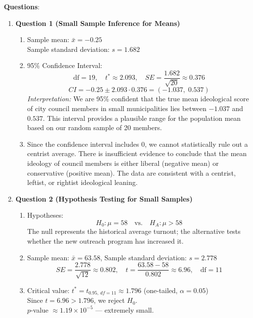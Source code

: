 \documentclass{article}
\begin{document}
\textbf{Questions}:
\begin{enumerate}

  \item \textbf{Question 1 (Small Sample Inference for Means)}
  \begin{enumerate}[label=(\alph*)]
    \item Sample mean: $\bar{x} = -0.25$ \\
          Sample standard deviation: $s = 1.682$

    \item 95\% Confidence Interval:
    \[
    \text{df} = 19,\quad t^* \approx 2.093,\quad SE = \frac{1.682}{\sqrt{20}} \approx 0.376
    \]
    \[
    CI = -0.25 \pm 2.093 \cdot 0.376 = (-1.037,\; 0.537)
    \]
    \textit{Interpretation:} We are 95\% confident that the true mean ideological score of city council members in small municipalities lies between $-1.037$ and $0.537$. This interval provides a plausible range for the population mean based on our random sample of 20 members.

    \item Since the confidence interval includes $0$, we cannot statistically rule out a centrist average. There is insufficient evidence to conclude that the mean ideology of council members is either liberal (negative mean) or conservative (positive mean). The data are consistent with a centrist, leftist, or rightist ideological leaning.
  \end{enumerate}

  \item \textbf{Question 2 (Hypothesis Testing for Small Samples)}
  \begin{enumerate}[label=(\alph*)]
    \item Hypotheses:
    \[
    H_0: \mu = 58 \quad\text{vs.}\quad H_A: \mu > 58
    \]
    The null represents the historical average turnout; the alternative tests whether the new outreach program has increased it.

    \item Sample mean: $\bar{x} = 63.58$, Sample standard deviation: $s = 2.778$ \\
    \[
    SE = \frac{2.778}{\sqrt{12}} \approx 0.802,\quad
    t = \frac{63.58 - 58}{0.802} \approx 6.96,\quad
    \text{df} = 11
    \]

    \item Critical value: $t^* = t_{0.95,\,df=11} \approx 1.796$ (one-tailed, $\alpha = 0.05$) \\
    Since $t = 6.96 > 1.796$, we reject $H_0$. \\
    $p$-value $\approx 1.19 \times 10^{-5}$ — extremely small.


\end{enumerate}
\end{enumerate}
\end{document}
